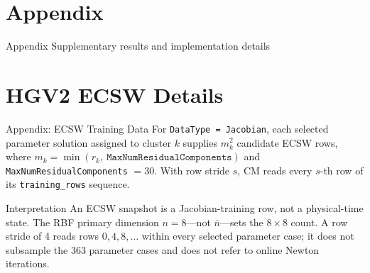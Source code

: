 \documentclass[aspectratio=169]{beamer}
\begin{document}
\appendix

\section{Appendix}

\begin{frame}{Appendix}
\centering
\Large Supplementary results and implementation details
\end{frame}

\section{HGV2 ECSW Details}

\begin{frame}{Appendix: ECSW Training Data}
\centering
\scriptsize
For \texttt{DataType = Jacobian}, each selected parameter solution assigned to cluster $k$ supplies
$m_k^2$ candidate ECSW rows, where
$m_k=\min\!\left(r_k,\ \texttt{MaxNumResidualComponents}\right)$ and
\texttt{MaxNumResidualComponents} $=30$. With row stride $s$, CM reads every $s$-th row of its \texttt{training\_rows} sequence.

\vspace{0.08cm}
\renewcommand{\arraystretch}{1.10}
\setlength{\tabcolsep}{3pt}

\vspace{0.08cm}
\begin{block}{Interpretation}
\tiny An ECSW snapshot is a Jacobian-training row, not a physical-time state. The RBF primary dimension $n=8$---not $\bar n$---sets the $8\times8$ count. A row stride of 4 reads rows $0,4,8,\ldots$ within every selected parameter case; it does not subsample the 363 parameter cases and does not refer to online Newton iterations.
\end{block}
\end{frame}
\end{document}
